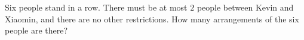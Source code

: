 Six people stand in a row. There must be at most $2$ people between Kevin and Xiaomin, and there are no other restrictions. How many arrangements of the six people are there?
